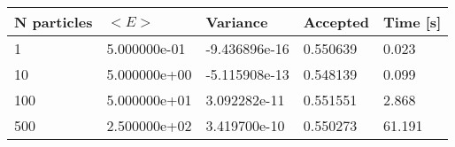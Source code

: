 \begin{table}[h!]
\begin{tabular}{|l|l|l|l|l|}
\hline 
N particles & $<E>$ & Variance & Accepted & Time [s]\\ 
 \hline 
1 & 5.000000e-01 & -9.436896e-16 & 0.550639 & 0.023 \\ \hline 
10 & 5.000000e+00 & -5.115908e-13 & 0.548139 & 0.099 \\ \hline 
100 & 5.000000e+01 & 3.092282e-11 & 0.551551 & 2.868 \\ \hline 
500 & 2.500000e+02 & 3.419700e-10 & 0.550273 & 61.191 \\ \hline 
\end{tabular}
\label{tab:hn1} 
\end{table} 
